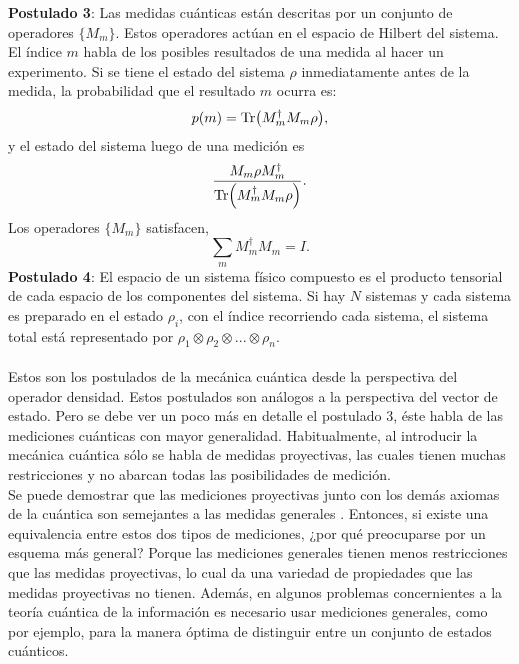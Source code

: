 \textbf{Postulado 3}: Las medidas cuánticas están descritas por un conjunto de operadores $ \{  M_{m} \}$. Estos operadores actúan en el espacio de Hilbert del sistema. El índice $m$ habla de los posibles resultados de una medida al hacer un experimento. Si se tiene el estado del sistema $\rho$ inmediatamente antes de la medida, la probabilidad que el resultado $m$ ocurra es:
\begin{equation}
p(m)= \Tr (M^{\dagger}_{m}M_{m} \rho),
\end{equation}
y el estado del sistema luego de una medición es
\begin{equation}
\frac{M_{m} \rho M_{m}^{\dagger}}{\Tr(M^{\dagger}_{m}M_{m} \rho)}.
\end{equation}
Los operadores $\{  M_{m} \}$ satisfacen,
\begin{equation}
\sum_{m} M^{\dagger}_{m}M_{m} = I.
\end{equation}
\textbf{Postulado 4}: El espacio de un sistema físico compuesto es el producto tensorial de cada espacio de los componentes del sistema. Si  hay $N$ sistemas y cada sistema es preparado en el estado $\rho_{i}$, con el índice recorriendo cada sistema, el sistema total está representado por $\rho_{1} \otimes \rho_{2} \otimes ...\otimes \rho_{n}$.
\\
\\
Estos son los postulados de la mecánica cuántica desde la perspectiva del operador densidad. Estos postulados son análogos a la perspectiva del vector de estado. Pero se debe ver un poco más en detalle el postulado 3, éste habla de las mediciones cuánticas con mayor generalidad. Habitualmente, al introducir la mecánica cuántica sólo se habla de medidas proyectivas, las cuales tienen muchas restricciones y no abarcan todas las posibilidades de medición.
\\	
Se puede demostrar que las mediciones proyectivas junto con los demás axiomas de la cuántica son semejantes a las medidas generales \cite{NielsenInformation}. Entonces, si existe una equivalencia entre estos dos tipos de mediciones, ¿por qué preocuparse por un esquema más general? Porque las mediciones generales tienen menos restricciones que las medidas proyectivas, lo cual da una variedad de propiedades que las medidas proyectivas no tienen. Además, en algunos problemas concernientes a la teoría cuántica de la información es necesario usar mediciones generales, como por ejemplo, para la manera óptima de distinguir entre un conjunto de estados cuánticos.
\\
